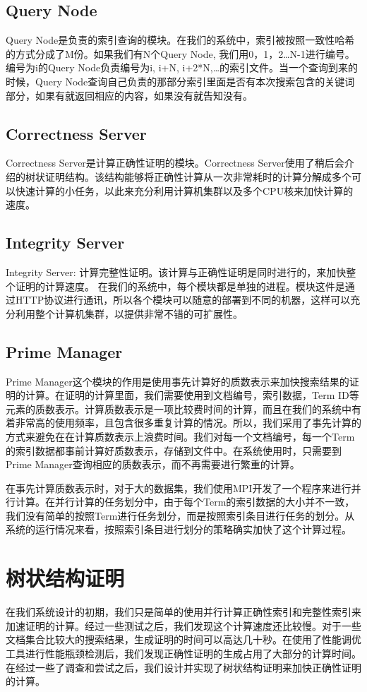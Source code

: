 \subsection{Query Node}
Query Node是负责的索引查询的模块。在我们的系统中，索引被按照一致性哈希的方式分成了M份。如果我们有N个Query Node, 我们用0，1，2…N-1进行编号。编号为i的Query Node负责编号为i, i+N, i+2*N,…的索引文件。当一个查询到来的时候，Query Node查询自己负责的那部分索引里面是否有本次搜索包含的关键词部分，如果有就返回相应的内容，如果没有就告知没有。

\subsection{Correctness Server}
Correctness Server是计算正确性证明的模块。Correctness Server使用了稍后会介绍的树状证明结构。该结构能够将正确性计算从一次非常耗时的计算分解成多个可以快速计算的小任务，以此来充分利用计算机集群以及多个CPU核来加快计算的速度。

\subsection{Integrity Server}
Integrity Server: 计算完整性证明。该计算与正确性证明是同时进行的，来加快整个证明的计算速度。
在我们的系统中，每个模块都是单独的进程。模块这件是通过HTTP协议进行通讯，所以各个模块可以随意的部署到不同的机器，这样可以充分利用整个计算机集群，以提供非常不错的可扩展性。

\subsection{Prime Manager}
Prime Manager这个模块的作用是使用事先计算好的质数表示来加快搜索结果的证明的计算。在证明的计算里面，我们需要使用到文档编号，索引数据，Term ID等元素的质数表示。计算质数表示是一项比较费时间的计算，而且在我们的系统中有着非常高的使用频率，且包含很多重复计算的情况。所以，我们采用了事先计算的方式来避免在在计算质数表示上浪费时间。我们对每一个文档编号，每一个Term的索引数据都事前计算好质数表示，存储到文件中。在系统使用时，只需要到Prime Manager查询相应的质数表示，而不再需要进行繁重的计算。

在事先计算质数表示时，对于大的数据集，我们使用MPI开发了一个程序来进行并行计算。在并行计算的任务划分中，由于每个Term的索引数据的大小并不一致，我们没有简单的按照Term进行任务划分，而是按照索引条目进行任务的划分。从系统的运行情况来看，按照索引条目进行划分的策略确实加快了这个计算过程。

\section{树状结构证明}
在我们系统设计的初期，我们只是简单的使用并行计算正确性索引和完整性索引来加速证明的计算。经过一些测试之后，我们发现这个计算速度还比较慢。对于一些文档集合比较大的搜索结果，生成证明的时间可以高达几十秒。在使用了性能调优工具进行性能瓶颈检测后，我们发现正确性证明的生成占用了大部分的计算时间。在经过一些了调查和尝试之后，我们设计并实现了树状结构证明来加快正确性证明的计算。

